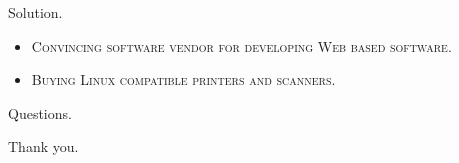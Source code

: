 \documentclass{beamer}
\begin{document}
\begin{frame}{}
\begin{center}
Solution.
\begin{itemize}\itemsep1pt \parskip0pt 
\item \textsc{\small Convincing software vendor for developing Web based software.}
\item \textsc{\small Buying Linux compatible printers and scanners.}
\end{itemize}
\end{center}
\end{frame}


\begin{frame}{}
\begin{center}
Questions.
\end{center}
\end{frame}


\begin{frame}{}
\begin{center}
Thank you.
\end{center}
\end{frame}
\end{document}

